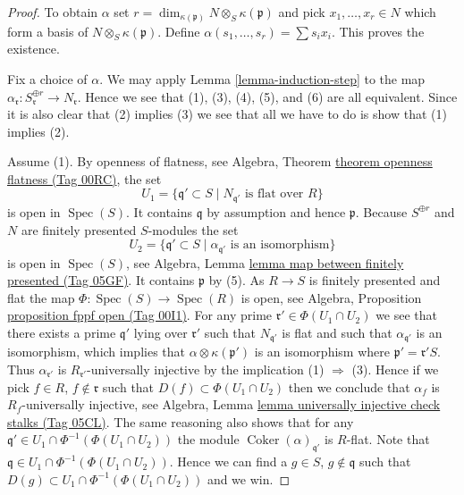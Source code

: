 \documentclass{amsart}
\theoremstyle{plain}
\theoremstyle{definition}
\theoremstyle{remark}
\numberwithin{equation}{subsection}
\def\Spec{\mathop{\mathrm{Spec}}}
\def\Coker{\mathop{\mathrm{Coker}}}
\begin{document}
\begin{proof}
To obtain $\alpha$ set
$r = \dim_{\kappa(\mathfrak p)} N \otimes_S \kappa(\mathfrak p)$ and pick
$x_1, \ldots, x_r \in N$ which form a basis of
$N \otimes_S \kappa(\mathfrak p)$. Define
$\alpha(s_1, \ldots, s_r) = \sum s_i x_i$. This proves the existence.

\medskip\noindent
Fix a choice of $\alpha$.
We may apply
Lemma \ref{lemma-induction-step}
to the map
$\alpha_{\mathfrak r} : S_{\mathfrak r}^{\oplus r} \to N_{\mathfrak r}$.
Hence we see that (1), (3), (4), (5), and (6) are all equivalent.
Since it is also clear that (2) implies (3) we see that all we have to
do is show that (1) implies (2).

\medskip\noindent
Assume (1). By openness of flatness, see
Algebra, Theorem \href{https://stacks.math.columbia.edu/tag/00RC}{theorem openness flatness (Tag 00RC)},
the set
$$
U_1 = \{\mathfrak q' \subset S \mid N_{\mathfrak q'}\text{ is flat over }R\}
$$
is open in $\Spec(S)$. It contains $\mathfrak q$ by assumption
and hence $\mathfrak p$. Because $S^{\oplus r}$ and $N$ are finitely presented
$S$-modules the set
$$
U_2 = \{\mathfrak q' \subset S \mid
\alpha_{\mathfrak q'}\text{ is an isomorphism}\}
$$
is open in $\Spec(S)$, see
Algebra, Lemma \href{https://stacks.math.columbia.edu/tag/05GF}{lemma map between finitely presented (Tag 05GF)}.
It contains $\mathfrak p$ by (5). As $R \to S$
is finitely presented and flat the map
$\Phi : \Spec(S) \to \Spec(R)$ is open, see
Algebra, Proposition \href{https://stacks.math.columbia.edu/tag/00I1}{proposition fppf open (Tag 00I1)}.
For any prime $\mathfrak r' \in \Phi(U_1 \cap U_2)$ we see that
there exists a prime $\mathfrak q'$ lying over $\mathfrak r'$ such that
$N_{\mathfrak q'}$ is flat and such that $\alpha_{\mathfrak q'}$ is
an isomorphism, which implies that $\alpha \otimes \kappa(\mathfrak p')$
is an isomorphism where $\mathfrak p' = \mathfrak r' S$. Thus
$\alpha_{\mathfrak r'}$ is $R_{\mathfrak r'}$-universally injective
by the implication (1) $\Rightarrow$ (3).
Hence if we pick $f \in R$, $f \not \in \mathfrak r$ such that
$D(f) \subset \Phi(U_1 \cap U_2)$ then we conclude that
$\alpha_f$ is $R_f$-universally injective, see
Algebra, Lemma \href{https://stacks.math.columbia.edu/tag/05CL}{lemma universally injective check stalks (Tag 05CL)}.
The same reasoning also shows that for any
$\mathfrak q' \in U_1 \cap \Phi^{-1}(\Phi(U_1 \cap U_2))$
the module $\Coker(\alpha)_{\mathfrak q'}$ is $R$-flat.
Note that $\mathfrak q \in U_1 \cap \Phi^{-1}(\Phi(U_1 \cap U_2))$.
Hence we can find a $g \in S$, $g \not \in \mathfrak q$ such
that $D(g) \subset U_1 \cap \Phi^{-1}(\Phi(U_1 \cap U_2))$
and we win.
\end{proof}
\end{document}
